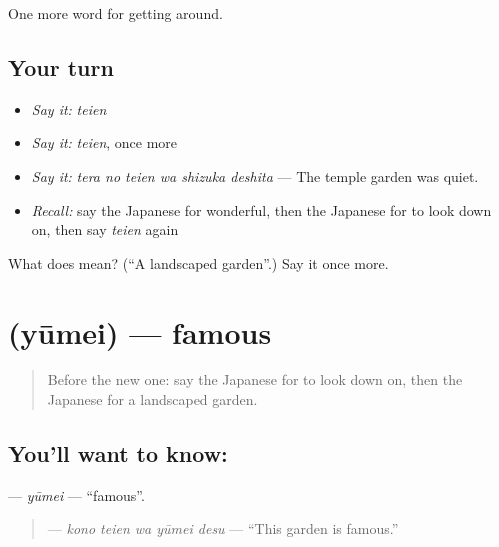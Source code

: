 \begin{grammarlens}[title={What you've built}]
One more word for getting around.
\end{grammarlens}

\subsection*{Your turn}
\begin{itemize}
\raggedright
  \item \emph{Say it:} \emph{teien}
  \item \emph{Say it:} \emph{teien}, once more
  \item \emph{Say it:} \emph{tera no teien wa shizuka deshita} — The temple garden was quiet.
  \item \emph{Recall:} say the Japanese for wonderful, then the Japanese for to look down on, then say \emph{teien} again
\end{itemize}

\begin{tcolorbox}[breakable,colback=teal!4,colframe=teal!35!black,title={Before you move on}]
What does  mean? (\textquotedblleft{}A landscaped garden\textquotedblright{}.) Say it once more.
\end{tcolorbox}
\section[\texorpdfstring{\ja{ゆうめい} (yūmei)}{ゆうめい (yūmei)}]{ (yūmei) — famous}

\label{lesson:JA-C405-yuumei}



\begin{quote}
Before the new one: say the Japanese for to look down on, then the Japanese for a landscaped garden.
\end{quote}

\subsection*{You'll want to know: }
\textbf{} — \emph{yūmei} — \textquotedblleft{}famous\textquotedblright{}.

\begin{quote}
\textbf{  } — \emph{kono teien wa yūmei desu} — \textquotedblleft{}This garden is famous.\textquotedblright{}
\end{quote}

